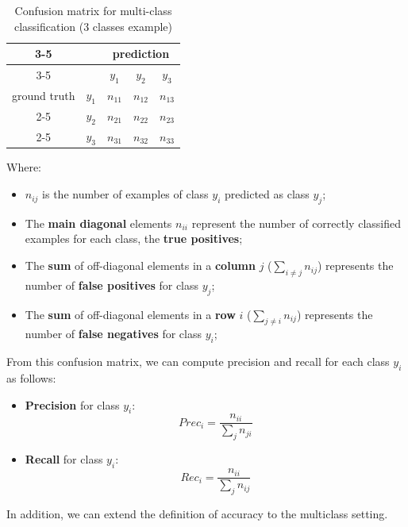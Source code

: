 \begin{table}[H]
    \centering
    \begin{tabular}{cc|c|c|c|}
        \cline{3-5}                                         &   & \multicolumn{3}{c|}{prediction} \\
        \cline{3-5}                                         &   & \multicolumn{1}{c|}{$y_1$} & \multicolumn{1}{c|}{$y_2$} & \multicolumn{1}{c|}{$y_3$}  \\
        \hline
        \multicolumn{1}{|c|}{ground truth} & $y_1$ & \multicolumn{1}{c|}{$n_{11}$} & \multicolumn{1}{c|}{$n_{12}$} & \multicolumn{1}{c|}{$n_{13}$} \\
        \cline{2-5} \multicolumn{1}{|c|}{} & $y_2$ & \multicolumn{1}{c|}{$n_{21}$} & \multicolumn{1}{c|}{$n_{22}$} & \multicolumn{1}{c|}{$n_{23}$} \\
        \cline{2-5} \multicolumn{1}{|c|}{} & $y_3$ & \multicolumn{1}{c|}{$n_{31}$} & \multicolumn{1}{c|}{$n_{32}$} & \multicolumn{1}{c|}{$n_{33}$} \\
        \hline
    \end{tabular}
    \caption{Confusion matrix for multi-class classification (3 classes example)}
    \label{fig:multiClassConfusionMatrix}
\end{table}
Where:
\begin{itemize}
	\item $n_{ij}$ is the number of examples of class $y_i$ predicted as class $y_j$;
	\item The \textbf{main diagonal} elements $n_{ii}$ represent the number of correctly classified examples for each class, the \textbf{true positives};
	\item The \textbf{sum} of off-diagonal elements in a \textbf{column} $j$ ($\sum_{i \neq j} n_{ij}$) represents the number of \textbf{false positives} for class $y_j$;
	\item The \textbf{sum} of off-diagonal elements in a \textbf{row} $i$ ($\sum_{j \neq i} n_{ij}$) represents the number of \textbf{false negatives} for class $y_i$;
\end{itemize}
From this confusion matrix, we can compute precision and recall for each class $y_i$ as follows:
\begin{itemize}
	\item \textbf{Precision} for class $y_i$:
	\[\mathit{Prec}_i = \frac{n_{ii}}{\sum_{j} n_{ji}}\]
	\item \textbf{Recall} for class $y_i$:
	\[\mathit{Rec}_i = \frac{n_{ii}}{\sum_{j} n_{ij}}\]
\end{itemize}
In addition, we can extend the definition of accuracy to the multiclass setting.

